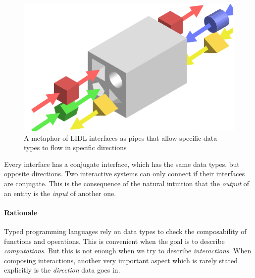 \documentclass[10pt]{sigplanconf}
\begin{document}
\begin{figure}[h]
\centering
\includegraphics[width=\linewidth,height=\linewidth,keepaspectratio]{figures/interface.pdf}
\caption{A metaphor of LIDL interfaces as pipes that allow specific data types to flow in specific directions } 
\label{fig:interface}
\end{figure}

Every interface has a conjugate interface, which has the same data types, but opposite directions. Two interactive systems can only connect if their interfaces are conjugate. This is the consequence of the natural intuition that the \emph{output} of an entity is the \emph{input} of another one.



\paragraph{Rationale}

Typed programming languages rely on data types to check the composability of functions and operations. This is convenient when the goal is to describe \emph{computations}. But this is not enough when we try to describe \emph{interactions}.  When composing interactions, another very important aspect which is rarely stated explicitly is the \emph{direction} data goes in. 
\end{document}
